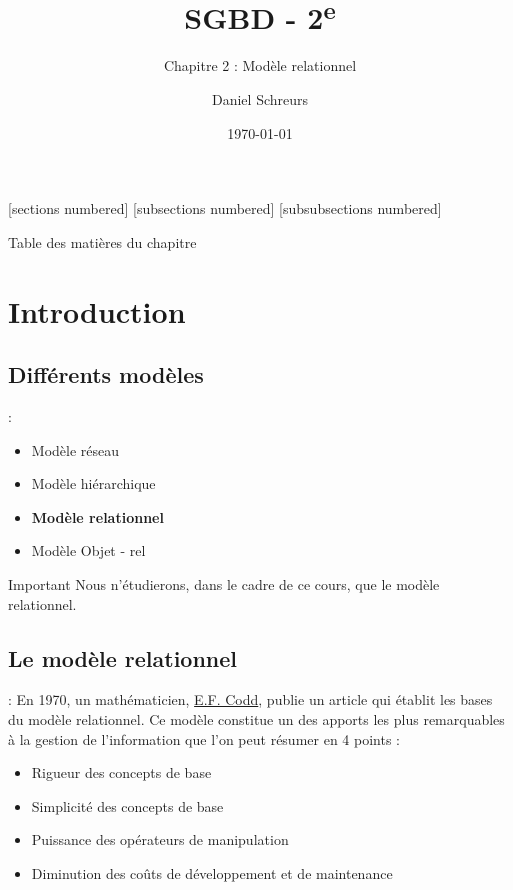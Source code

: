 \documentclass[10pt]{beamer}
\title{SGBD - 2\textsuperscript{e}}
\subtitle{Chapitre 2 : Modèle relationnel}
\date{\today}
\author{Daniel Schreurs}
\institute{Haute École de Province de Liège}
\begin{document}
\maketitle

[sections numbered]
[subsections numbered]
[subsubsections numbered]
\begin{frame}[allowframebreaks]{Table des matières du chapitre}
    \tableofcontents[subsectionstyle=show/show/hide,subsubsectionstyle=show/show/hide,]
\end{frame}

\section{Introduction}
\tocss

\subsection{Différents modèles}
\begin{frame}{\secname : \subsecname}
    \begin{itemize}
        \item Modèle réseau
        \item Modèle hiérarchique
        \item \textbf{Modèle relationnel}
        \item Modèle Objet - rel
    \end{itemize}
    \begin{alertblock}{Important}
        Nous n'étudierons, dans le cadre de ce cours, que le modèle relationnel.
    \end{alertblock}
\end{frame}

\subsection{Le modèle relationnel}
\begin{frame}{\secname : \subsecname}
    En 1970, un mathématicien, \href{https://fr.wikipedia.org/wiki/Edgar_Frank_Codd}{E.F. Codd}, publie un article qui établit les bases du modèle relationnel.
    Ce modèle constitue un des apports les plus remarquables à la gestion de l’information que l’on peut résumer en 4 points :
    \begin{itemize}
        \item Rigueur des concepts de base
        \item Simplicité des concepts de base
        \item Puissance des opérateurs de manipulation
        \item Diminution des coûts de développement et de maintenance
    \end{itemize}
\end{frame}
\end{document}
